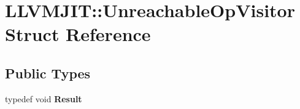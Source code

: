 \hypertarget{struct_l_l_v_m_j_i_t_1_1_unreachable_op_visitor}{}\section{L\+L\+V\+M\+J\+IT\+:\+:Unreachable\+Op\+Visitor Struct Reference}
\label{struct_l_l_v_m_j_i_t_1_1_unreachable_op_visitor}
\subsection*{Public Types}
\begin{DoxyCompactItemize}
\item 
\mbox{\label{struct_l_l_v_m_j_i_t_1_1_unreachable_op_visitor_ae0d040016096b939c28c616ad7b23d7a}} 
typedef void {\bfseries Result}
\end{DoxyCompactItemize}
